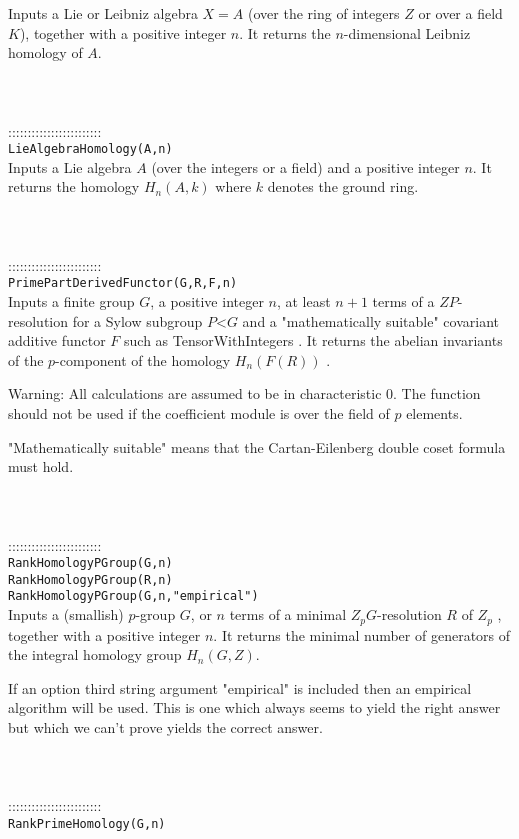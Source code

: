 \documentclass[a4paper,11pt]{report}
\begin{document}
{ Inputs a Lie or Leibniz algebra $X=A$ (over the ring of integers $Z$ or over a field $K$), together with a positive integer $n$. It returns the $n$-dimensional Leibniz homology of $A$. \\
 \\
 \\
 \\
 ::::::::::::::::::::::::\\
 \texttt{LieAlgebraHomology(A,n)}\\
 

 Inputs a Lie algebra $A$ (over the integers or a field) and a positive integer $n$. It returns the homology $H_n(A,k)$ where $k$ denotes the ground ring. \\
 \\
 \\
 \\
 ::::::::::::::::::::::::\\
 \texttt{PrimePartDerivedFunctor(G,R,F,n)}\\
 

 Inputs a finite group $G$, a positive integer $n$, at least $n+1$ terms of a $ZP$-resolution for a Sylow subgroup $P${\textless}$G$ and a "mathematically suitable" covariant additive functor $F$ such as TensorWithIntegers . It returns the abelian invariants of the $p$-component of the homology $H_n(F(R))$ . 

 Warning: All calculations are assumed to be in characteristic 0. The function
should not be used if the coefficient module is over the field of $p$ elements. 

 "Mathematically suitable" means that the Cartan-Eilenberg double coset formula
must hold. \\
 \\
 \\
 \\
 ::::::::::::::::::::::::\\
 \texttt{RankHomologyPGroup(G,n)}\\
 \texttt{RankHomologyPGroup(R,n)}\\
 \texttt{RankHomologyPGroup(G,n,"empirical")}\\
 

 Inputs a (smallish) $p$-group $G$, or $n$ terms of a minimal $Z_pG$-resolution $R$ of $Z_p$ , together with a positive integer $n$. It returns the minimal number of generators of the integral homology group $H_n(G,Z)$. 

 If an option third string argument "empirical" is included then an empirical
algorithm will be used. This is one which always seems to yield the right
answer but which we can't prove yields the correct answer. \\
 \\
 \\
 \\
 ::::::::::::::::::::::::\\
 \texttt{RankPrimeHomology(G,n)}\\
 

}
\end{document}
